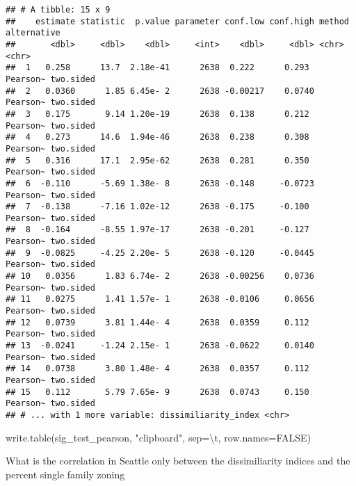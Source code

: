 \documentclass[
]{article}
\newenvironment{Shaded}{\begin{snugshade}}{\end{snugshade}}
\newcommand{\AttributeTok}[1]{\textcolor[rgb]{0.77,0.63,0.00}{#1}}
\newcommand{\ConstantTok}[1]{\textcolor[rgb]{0.00,0.00,0.00}{#1}}
\newcommand{\FunctionTok}[1]{\textcolor[rgb]{0.00,0.00,0.00}{#1}}
\newcommand{\NormalTok}[1]{#1}
\newcommand{\SpecialCharTok}[1]{\textcolor[rgb]{0.00,0.00,0.00}{#1}}
\newcommand{\StringTok}[1]{\textcolor[rgb]{0.31,0.60,0.02}{#1}}
\begin{document}
\begin{verbatim}
## # A tibble: 15 x 9
##    estimate statistic  p.value parameter conf.low conf.high method   alternative
##       <dbl>     <dbl>    <dbl>     <int>    <dbl>     <dbl> <chr>    <chr>      
##  1   0.258      13.7  2.18e-41      2638  0.222      0.293  Pearson~ two.sided  
##  2   0.0360      1.85 6.45e- 2      2638 -0.00217    0.0740 Pearson~ two.sided  
##  3   0.175       9.14 1.20e-19      2638  0.138      0.212  Pearson~ two.sided  
##  4   0.273      14.6  1.94e-46      2638  0.238      0.308  Pearson~ two.sided  
##  5   0.316      17.1  2.95e-62      2638  0.281      0.350  Pearson~ two.sided  
##  6  -0.110      -5.69 1.38e- 8      2638 -0.148     -0.0723 Pearson~ two.sided  
##  7  -0.138      -7.16 1.02e-12      2638 -0.175     -0.100  Pearson~ two.sided  
##  8  -0.164      -8.55 1.97e-17      2638 -0.201     -0.127  Pearson~ two.sided  
##  9  -0.0825     -4.25 2.20e- 5      2638 -0.120     -0.0445 Pearson~ two.sided  
## 10   0.0356      1.83 6.74e- 2      2638 -0.00256    0.0736 Pearson~ two.sided  
## 11   0.0275      1.41 1.57e- 1      2638 -0.0106     0.0656 Pearson~ two.sided  
## 12   0.0739      3.81 1.44e- 4      2638  0.0359     0.112  Pearson~ two.sided  
## 13  -0.0241     -1.24 2.15e- 1      2638 -0.0622     0.0140 Pearson~ two.sided  
## 14   0.0738      3.80 1.48e- 4      2638  0.0357     0.112  Pearson~ two.sided  
## 15   0.112       5.79 7.65e- 9      2638  0.0743     0.150  Pearson~ two.sided  
## # ... with 1 more variable: dissimiliarity_index <chr>
\end{verbatim}

\begin{Shaded}
\begin{Highlighting}[]
\FunctionTok{write.table}\NormalTok{(sig\_test\_pearson, }\StringTok{"clipboard"}\NormalTok{, }\AttributeTok{sep=}\StringTok{\textquotesingle{}}\SpecialCharTok{\textbackslash{}t}\StringTok{\textquotesingle{}}\NormalTok{, }\AttributeTok{row.names=}\ConstantTok{FALSE}\NormalTok{)}
\end{Highlighting}
\end{Shaded}

What is the correlation in Seattle only between the dissimiliarity
indices and the percent single family zoning
\end{document}
